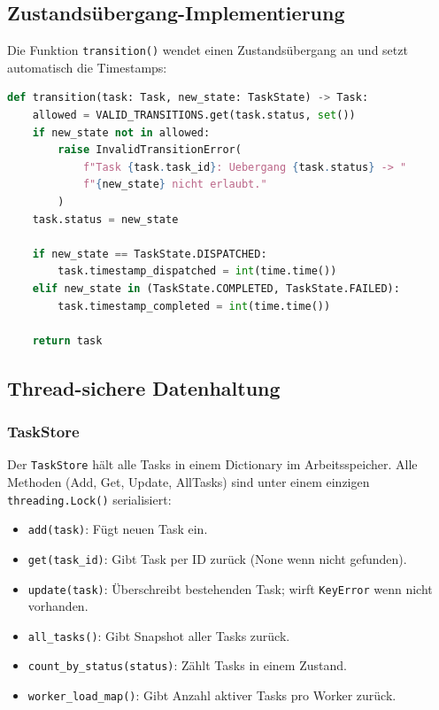 \subsection{Zustandsübergang-Implementierung}

Die Funktion \texttt{transition()} wendet einen Zustandsübergang an
und setzt automatisch die Timestamps:

\begin{lstlisting}[language=Python,caption={transition()-Funktion (state\_machine.py)}]
def transition(task: Task, new_state: TaskState) -> Task:
    allowed = VALID_TRANSITIONS.get(task.status, set())
    if new_state not in allowed:
        raise InvalidTransitionError(
            f"Task {task.task_id}: Uebergang {task.status} -> "
            f"{new_state} nicht erlaubt."
        )
    task.status = new_state

    if new_state == TaskState.DISPATCHED:
        task.timestamp_dispatched = int(time.time())
    elif new_state in (TaskState.COMPLETED, TaskState.FAILED):
        task.timestamp_completed = int(time.time())

    return task
\end{lstlisting}

\subsection{Thread-sichere Datenhaltung}

\subsubsection*{TaskStore}

Der \texttt{TaskStore} hält alle Tasks in einem Dictionary im Arbeitsspeicher.
Alle Methoden (Add, Get, Update, AllTasks) sind unter einem einzigen
\texttt{threading.Lock()} serialisiert:

\begin{itemize}
  \item \texttt{add(task)}: Fügt neuen Task ein.
  \item \texttt{get(task\_id)}: Gibt Task per ID zurück (None wenn nicht gefunden).
  \item \texttt{update(task)}: Überschreibt bestehenden Task; wirft
        \texttt{KeyError} wenn nicht vorhanden.
  \item \texttt{all\_tasks()}: Gibt Snapshot aller Tasks zurück.
  \item \texttt{count\_by\_status(status)}: Zählt Tasks in einem Zustand.
  \item \texttt{worker\_load\_map()}: Gibt Anzahl aktiver Tasks pro Worker zurück.
\end{itemize}

